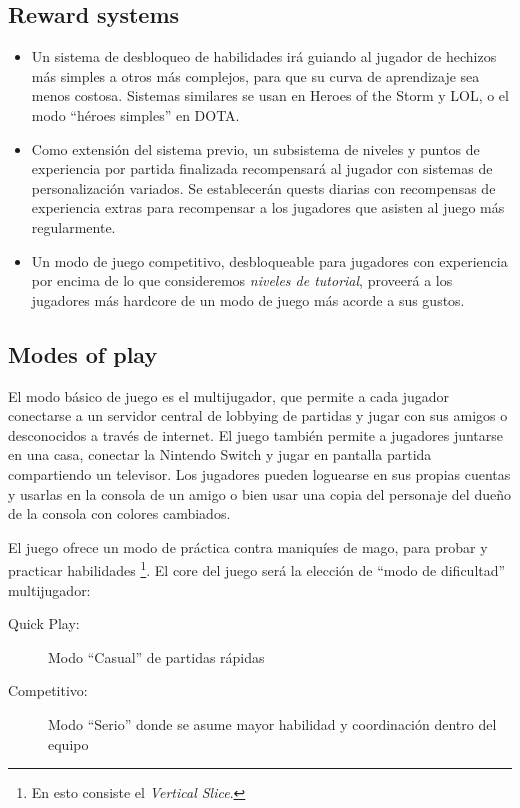 \documentclass[12pt]{report}
\begin{document}
\subsection{Reward systems}

\begin{itemize}
\item Un sistema de desbloqueo de habilidades irá guiando al jugador de hechizos más simples a otros más complejos, para que su curva de aprendizaje sea menos costosa. Sistemas similares se usan en Heroes of the Storm y LOL, o el modo ``héroes simples'' en DOTA.
\item Como extensión del sistema previo, un subsistema de niveles y puntos de experiencia por partida finalizada recompensará al jugador con sistemas de personalización variados. Se establecerán quests diarias con recompensas de experiencia extras para recompensar a los jugadores que asisten al juego más regularmente.
\item Un modo de juego competitivo, desbloqueable para jugadores con experiencia por encima de lo que consideremos \textit{niveles de tutorial}, proveerá a los jugadores más hardcore de un modo de juego más acorde a sus gustos.
\end{itemize}     

\subsection{Modes of play}

El modo básico de juego es el multijugador, que permite a cada jugador conectarse a un servidor central de lobbying de partidas y jugar con sus amigos o desconocidos a través de internet. El juego también permite a jugadores juntarse en una casa, conectar la Nintendo Switch y jugar en pantalla partida compartiendo un televisor. Los jugadores pueden loguearse en sus propias cuentas y usarlas en la consola de un amigo o bien usar una copia del personaje del dueño de la consola con colores cambiados.

El juego ofrece un modo de práctica contra maniquíes de mago, para probar y practicar habilidades \footnote{En esto consiste el \textit{Vertical Slice}.}. El core del juego será la elección de ``modo de dificultad'' multijugador:

\begin{description}
\item[Quick Play:] Modo ``Casual'' de partidas rápidas
\item[Competitivo:] Modo ``Serio'' donde se asume mayor habilidad y coordinación dentro del equipo
\end{description}
\end{document}
